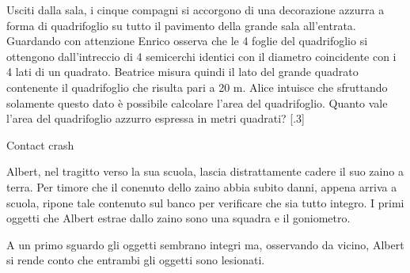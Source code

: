 \documentclass[12pt]{matemaj}
\begin{document}
\quesitotc[200;300]
[.7]Usciti dalla sala, i cinque compagni si accorgono di una decorazione azzurra a forma di quadrifoglio su tutto il pavimento della grande sala all'entrata. Guardando con attenzione Enrico osserva che le 4 foglie del quadrifoglio si ottengono dall'intreccio di 4 semicerchi identici con il diametro coincidente con i 4 lati di un quadrato. Beatrice misura quindi il lato del grande quadrato contenente il quadrifoglio che risulta pari a 20 m. Alice intuisce che sfruttando solamente questo dato è possibile calcolare l'area del quadrifoglio. Quanto vale l'area del quadrifoglio azzurro espressa in metri quadrati?
[.3]\tikspace{}

\newpage

\titolo Contact crash

Albert, nel tragitto verso la sua scuola, lascia distrattamente cadere il suo zaino a terra. Per timore che il conenuto dello zaino abbia subito danni, appena arriva a scuola, ripone tale contenuto sul banco per verificare che sia tutto integro. I primi oggetti che Albert estrae dallo zaino sono una squadra e il goniometro.
\begin{center}
\end{center}
A un primo sguardo gli oggetti sembrano integri ma, osservando da vicino, Albert si rende conto che entrambi gli oggetti sono lesionati.
\end{document}

